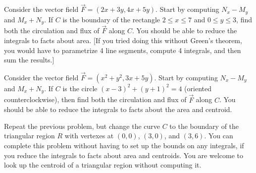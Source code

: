 \begin{problem}
 Consider the vector field $\vec F=(2x+3y,4x+5y)$. Start by computing $N_x-M_y$ and $M_x+N_y$. 
 If $C$ is the boundary of the rectangle $2\leq x\leq 7$ and $0\leq y\leq 3$, find both the circulation and flux of $\vec F$ along $C$. You should be able to reduce the integrals to facts about area. [If you tried doing this without Green's theorem, you would have to parametrize 4 line segments, compute 4 integrals, and then sum the results.]
\end{problem}

\begin{problem}
 Consider the vector field $\vec F=(x^2+y^2,3x+5y)$. Start by computing $N_x-M_y$ and $M_x+N_y$. 
 If $C$ is the circle $(x-3)^2+(y+1)^2=4$ (oriented counterclockwise), then find both the circulation and flux of $\vec F$ along $C$. You should be able to reduce the integrals to facts about the area and centroid.
\end{problem}

\begin{problem}
Repeat the previous problem, but change the curve $C$ to the boundary of the triangular region $R$ with vertexes at $(0,0)$, $(3,0)$, and $(3,6)$.  You can complete this problem without having to set up the bounds on any integrals, if you reduce the integrals to facts about area and centroids. You are welcome to look up the centroid of a triangular region without computing it.
\end{problem}



